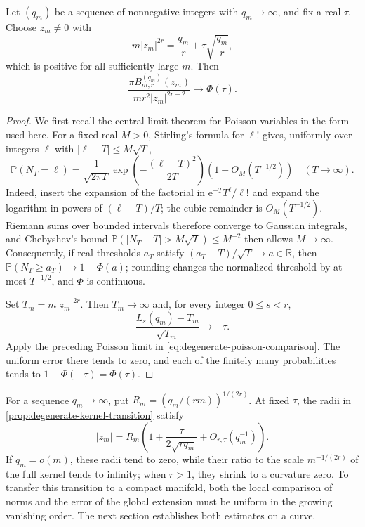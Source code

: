 \begin{proposition}\label{prop:degenerate-kernel-transition}
Let $(q_m)$ be a sequence of nonnegative integers with $q_m\to\infty$, and fix a real $\tau$. Choose $z_m\ne0$ with
\[
 m|z_m|^{2r}=\frac{q_m}{r}+\tau\sqrt{\frac{q_m}{r}},
\]
which is positive for all sufficiently large $m$. Then
\[
 \frac{\pi B_{m,r}^{(q_m)}(z_m)}{mr^2|z_m|^{2r-2}}
 \longrightarrow\Phi(\tau).
\]
\end{proposition}
\begin{proof}
We first recall the central limit theorem for Poisson variables in the form used here. For a fixed real $M>0$, Stirling's formula for $\ell!$ gives, uniformly over integers $\ell$ with $|\ell-T|\leq M\sqrt T$,
\[
 \mathbb P(N_T=\ell)=\frac1{\sqrt{2\pi T}}
   \exp\left(-\frac{(\ell-T)^2}{2T}\right)
           (1+O_M(T^{-1/2}))\quad(T\to\infty).
\]
Indeed, insert the expansion of the factorial in $\mathrm{e}^{-T}T^\ell/\ell!$ and expand the logarithm in powers of $(\ell-T)/T$; the cubic remainder is $O_M(T^{-1/2})$. Riemann sums over bounded intervals therefore converge to Gaussian integrals, and Chebyshev's bound
$\mathbb P(|N_T-T|>M\sqrt T)\leq M^{-2}$
then allows $M\to\infty$. Consequently, if real thresholds $a_T$ satisfy $(a_T-T)/\sqrt T\to a\in\mathbb R$, then
$\mathbb P(N_T\geq a_T)\to1-\Phi(a)$;
rounding changes the normalized threshold by at most $T^{-1/2}$, and $\Phi$ is continuous.

Set $T_m=m|z_m|^{2r}$. Then $T_m\to\infty$ and, for every integer $0\leq s<r$,
\[
 \frac{L_s(q_m)-T_m}{\sqrt{T_m}}\longrightarrow-\tau.
\]
Apply the preceding Poisson limit in \eqref{eq:degenerate-poisson-comparison}. The uniform error there tends to zero, and each of the finitely many probabilities tends to $1-\Phi(-\tau)=\Phi(\tau)$.
\end{proof}

For a sequence $q_m\to\infty$, put $R_m=(q_m/(rm))^{1/(2r)}$. At fixed $\tau$, the radii in \cref{prop:degenerate-kernel-transition} satisfy
\[
 |z_m|=R_m\left(1+\frac{\tau}{2\sqrt{rq_m}}+O_{r,\tau}(q_m^{-1})\right).
\]
If $q_m=o(m)$, these radii tend to zero, while their ratio to the scale $m^{-1/(2r)}$ of the full kernel tends to infinity; when $r>1$, they shrink to a curvature zero. To transfer this transition to a compact manifold, both the local comparison of norms and the error of the global extension must be uniform in the growing vanishing order. The next section establishes both estimates on a curve.
